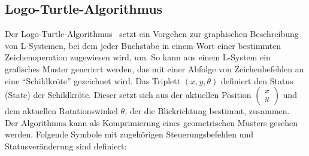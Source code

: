 \subsection*{Logo-Turtle-Algorithmus}
Der Logo-Turtle-Algorithmus~\cite{prusinkiewicz_1986} setzt ein Vorgehen zur graphischen Beschreibung von L-Systemen, bei dem
jeder Buchstabe in einem Wort einer bestimmten Zeichenoperation zugewiesen wird, um.
So kann aus einem L-System ein grafisches Muster generiert werden, das mit einer Abfolge von Zeichenbefehlen an
eine "`Schildkröte"' gezeichnet wird.
Das Triplett $(x,y,\theta)$ definiert den Status (State) der Schildkröte.
Dieser setzt sich aus der aktuellen Position $\left(\begin{smallmatrix} x \\ y \end{smallmatrix}\right)$ und dem
aktuellen Rotationswinkel $\theta$, der die Blickrichtung bestimmt, zusammen.\\
Der Algorithmus kann als Komprimierung eines geometrischen Musters gesehen werden.
Folgende Symbole mit zugehörigen Steuerungsbefehlen und Statusveränderung sind definiert:
